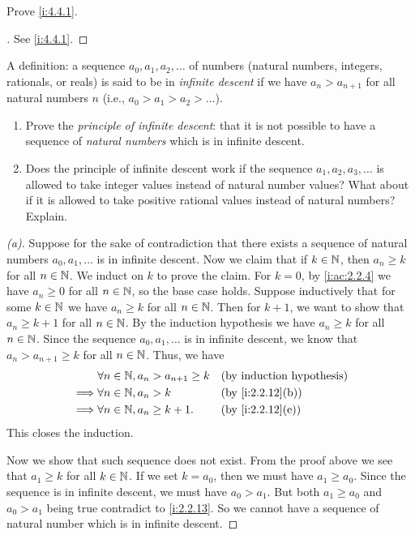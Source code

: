 \exercisesection

\begin{ex}\label{i:ex:4.4.1}
  Prove \cref{i:4.4.1}.
\end{ex}

\begin{proof}[]
  See \cref{i:4.4.1}.
\end{proof}

\begin{ex}\label{i:ex:4.4.2}
  A definition: a sequence \(a_0, a_1, a_2, \dots\) of numbers (natural numbers, integers, rationals, or reals) is said to be in \emph{infinite descent} if we have \(a_n > a_{n + 1}\) for all natural numbers \(n\)
  (i.e., \(a_0 > a_1 > a_2 > \dots\)).
  \begin{enumerate}
    \item Prove the \emph{principle of infinite descent}:
          that it is not possible to have a sequence of \emph{natural numbers} which is in infinite descent.
    \item Does the principle of infinite descent work if the sequence \(a_1, a_2, a_3, \dots\) is allowed to take integer values instead of natural number values?
          What about if it is allowed to take positive rational values instead of natural numbers?
          Explain.
  \end{enumerate}
\end{ex}

\begin{proof}[(a)]
  Suppose for the sake of contradiction that there exists a sequence of natural numbers \(a_0, a_1, \dots\) is in infinite descent.
  Now we claim that if \(k \in \mathbb{N}\), then \(a_n \geq k\) for all \(n \in \mathbb{N}\).
  We induct on \(k\) to prove the claim.
  For \(k = 0\), by \cref{i:ac:2.2.4} we have \(a_n \geq 0\) for all \(n \in \mathbb{N}\), so the base case holds.
  Suppose inductively that for some \(k \in \mathbb{N}\) we have \(a_n \geq k\) for all \(n \in \mathbb{N}\).
  Then for \(k + 1\), we want to show that \(a_n \geq k + 1\) for all \(n \in \mathbb{N}\).
  By the induction hypothesis we have \(a_n \geq k\) for all \(n \in \mathbb{N}\).
  Since the sequence \(a_0, a_1, \dots\) is in infinite descent, we know that \(a_n > a_{n + 1} \geq k\) for all \(n \in \mathbb{N}\).
  Thus, we have
  \begin{align*}
             & \forall n \in \N, a_n > a_{n + 1} \geq k &  & \byIH            \\
    \implies & \forall n \in \N, a_n > k                &  & \by{i:2.2.12}[b] \\
    \implies & \forall n \in \N, a_n \geq k + 1.        &  & \by{i:2.2.12}[e]
  \end{align*}
  This closes the induction.

  Now we show that such sequence does not exist.
  From the proof above we see that \(a_1 \geq k\) for all \(k \in \mathbb{N}\).
  If we set \(k = a_0\), then we must have \(a_1 \geq a_0\).
  Since the sequence is in infinite descent, we must have \(a_0 > a_1\).
  But both \(a_1 \geq a_0\) and \(a_0 > a_1\) being true contradict to \cref{i:2.2.13}.
  So we cannot have a sequence of natural number which is in infinite descent.
\end{proof}

